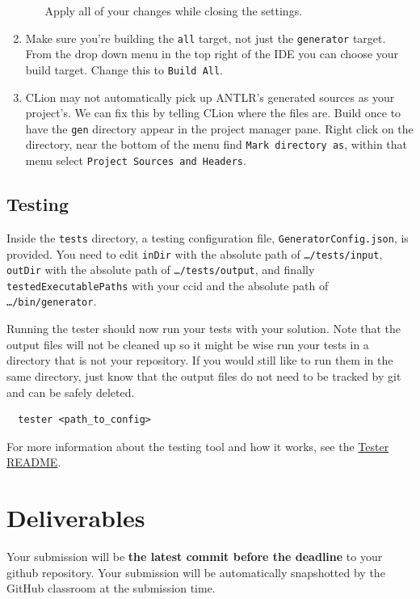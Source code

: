 \documentclass{article}
\newcommand{\code}[1]{\texttt{\textmd{#1}}}
\begin{document}
\begin{enumerate}
\begin{enumerate}
        Apply all of your changes while closing the settings.
    \end{enumerate}
  \item
    Make sure you're building the \texttt{all} target, not just the \texttt{generator} target.
    From the drop down menu in the top right of the IDE you can choose your build target. Change
    this to \texttt{Build All}.
  \item
    CLion may not automatically pick up ANTLR's generated sources as your project's. We can fix
    this by telling CLion where the files are. Build once to have the \code{gen} directory appear
    in the project manager pane. Right click on the directory, near the bottom of the menu find
    \texttt{Mark directory as}, within that menu select \texttt{Project Sources and Headers}.
\end{enumerate}

\subsection{Testing}
Inside the \code{tests} directory, a testing configuration file, \code{GeneratorConfig.json}, is
provided. You need to edit \code{inDir} with the absolute path of \code{\ldots/tests/input},
\code{outDir} with the absolute path of \code{\ldots/tests/output}, and finally
\code{testedExecutablePaths} with your ccid and the absolute path of \code{\ldots/bin/generator}.

Running the tester should now run your tests with your solution. Note that the output files will
not be cleaned up so it might be wise run your tests in a directory that is not your repository. If
you would still like to run them in the same directory, just know that the output files do not need
to be tracked by git and can be safely deleted.
\begin{lstlisting}
  tester <path_to_config>
\end{lstlisting}

For more information about the testing tool and how it works, see the
\href{https://github.com/cmput415/Tester/blob/master/README.md}{Tester README}.

\section{Deliverables}
Your submission will be \textbf{the latest commit before the deadline} to your github repository.
Your submission will be automatically snapshotted by the GitHub classroom at the submission time.
\end{document}
